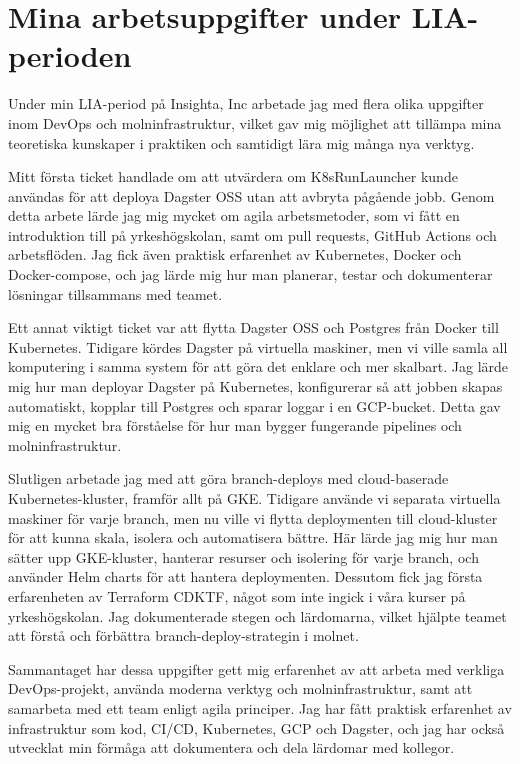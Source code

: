 \section{Mina arbetsuppgifter under LIA-perioden}
\label{sec:arbetsuppgifter}

Under min LIA-period på Insighta, Inc arbetade jag med flera olika uppgifter inom DevOps och molninfrastruktur, vilket gav mig möjlighet att tillämpa mina teoretiska kunskaper i praktiken och samtidigt lära mig många nya verktyg.

Mitt första ticket handlade om att utvärdera om K8sRunLauncher kunde användas för att deploya Dagster OSS utan att avbryta pågående jobb. Genom detta arbete lärde jag mig mycket om agila arbetsmetoder, som vi fått en introduktion till på yrkeshögskolan, samt om pull requests, GitHub Actions och arbetsflöden. Jag fick även praktisk erfarenhet av Kubernetes, Docker och Docker-compose, och jag lärde mig hur man planerar, testar och dokumenterar lösningar tillsammans med teamet.

Ett annat viktigt ticket var att flytta Dagster OSS och Postgres från Docker till Kubernetes. Tidigare kördes Dagster på virtuella maskiner, men vi ville samla all komputering i samma system för att göra det enklare och mer skalbart. Jag lärde mig hur man deployar Dagster på Kubernetes, konfigurerar så att jobben skapas automatiskt, kopplar till Postgres och sparar loggar i en GCP-bucket. Detta gav mig en mycket bra förståelse för hur man bygger fungerande pipelines och molninfrastruktur.

Slutligen arbetade jag med att göra branch-deploys med cloud-baserade Kubernetes-kluster, framför allt på GKE. Tidigare använde vi separata virtuella maskiner för varje branch, men nu ville vi flytta deploymenten till cloud-kluster för att kunna skala, isolera och automatisera bättre. Här lärde jag mig hur man sätter upp GKE-kluster, hanterar resurser och isolering för varje branch, och använder Helm charts för att hantera deploymenten. Dessutom fick jag första erfarenheten av Terraform CDKTF, något som inte ingick i våra kurser på yrkeshögskolan. Jag dokumenterade stegen och lärdomarna, vilket hjälpte teamet att förstå och förbättra branch-deploy-strategin i molnet.

Sammantaget har dessa uppgifter gett mig erfarenhet av att arbeta med verkliga DevOps-projekt, använda moderna verktyg och molninfrastruktur, samt att samarbeta med ett team enligt agila principer. Jag har fått praktisk erfarenhet av infrastruktur som kod, CI/CD, Kubernetes, GCP och Dagster, och jag har också utvecklat min förmåga att dokumentera och dela lärdomar med kollegor.